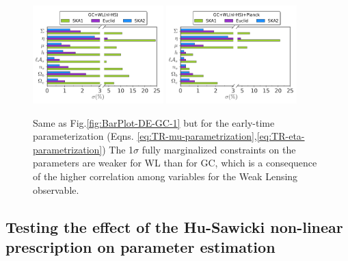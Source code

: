 \begin{figure}[htbp]
\begin{centering}
\includegraphics[width=0.45\textwidth]{Chapters/linear-nonlinear-MG-forecasts/figures/BarPlots/4surveys-GC+WLnlHS-MGTR-earlytime}\hspace{-0.5pt}
\includegraphics[width=0.45\textwidth]{Chapters/linear-nonlinear-MG-forecasts/figures/BarPlots/4surveys-GC+WLnlHS+Planck-MGTR-earlytime}
\par\end{centering}
\caption[Comparison of 1$\sigma$ errors on cosmological parameters for GC, WL and Planck for future surveys in the late-time parametrization.]{\label{fig:BarPlot-MGTR-Surveys} Same as Fig.\ref{fig:BarPlot-DE-GC-1} but for the early-time parameterization (Eqns. \ref{eq:TR-mu-parametrization},\ref{eq:TR-eta-parametrization})
The 1$\sigma$ fully marginalized
constraints on the parameters are weaker for WL than for GC,
which is a consequence of the higher correlation among variables
for the Weak Lensing observable. 
}
\end{figure}



\subsection{Testing the effect of the Hu-Sawicki non-linear prescription on parameter estimation
\label{sub:Testing-the-effect-of-Zhao}}

